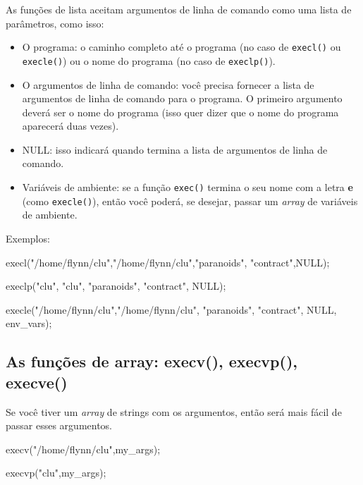 \documentclass[12pt, a4paper]{article}
\begin{document}
As funções de lista aceitam argumentos de linha de comando como uma lista de parâmetros, como isso:

\begin{itemize}
\item O programa: o caminho completo até o programa (no caso de \verb|execl()| ou \verb|execle()|) ou o nome do programa (no caso de \verb|execlp()|).
\item O argumentos de linha de comando: você precisa fornecer a lista de argumentos de linha de comando para o programa. O primeiro argumento deverá ser o nome do programa (isso quer dizer que o nome do programa aparecerá duas vezes).
\item NULL: isso indicará quando termina a lista de argumentos de linha de comando.
\item Variáveis de ambiente: se a função \verb|exec()| termina o seu nome com a letra \textbf{e} (como \verb|execle()|), então você poderá, se desejar, passar um \textit{array} de variáveis de ambiente.
\end{itemize}

Exemplos:\\

\begin{ccode}
execl("/home/flynn/clu","/home/flynn/clu","paranoids",
"contract",NULL);
\end{ccode}

\begin{ccode}
execlp("clu", "clu", "paranoids", "contract", NULL);
\end{ccode}

\begin{ccode}
execle("/home/flynn/clu","/home/flynn/clu", "paranoids",
 "contract", NULL, env_vars);
\end{ccode}

\subsection{As funções de array: execv(), execvp(), execve()}

Se você tiver um \textit{array} de strings com os argumentos, então será mais fácil de passar esses argumentos.\\

\begin{ccode}
execv("/home/flynn/clu",my_args);
\end{ccode}

\begin{ccode}
execvp("clu",my_args);
\end{ccode}
\end{document}
